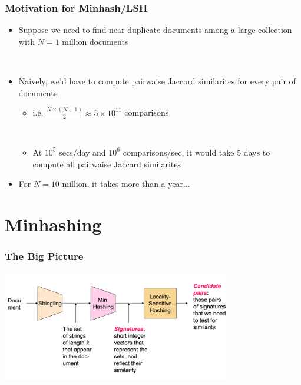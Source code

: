 \documentclass[svgnames]{beamer}
\begin{document}
\begin{frame} \frametitle{Motivation for Minhash/LSH}

\begin{itemize}
\item Suppose we need to find near-duplicate documents among a large collection with $N=1$ million documents

~\\

\item Naively, we'd have to compute pairwaise Jaccard similarites for every pair of documents
\begin{itemize}
  \item i.e, $\frac{N \times (N-1)}{2} \approx 5 \times 10^{11}$ comparisons

  ~\\
  
  \item At $10^5$ secs/day and $10^6$ comparisons/sec, it would take 5 days to compute all pairwaise Jaccard similarites
\end{itemize}

\item For $N = 10$ million, it takes more than a year...
\end{itemize}
\end{frame}

\section{Minhashing}

  
\begin{frame} \frametitle{The Big Picture}
\includegraphics[width=10cm]{overall}
\end{frame}

  
\end{document}
